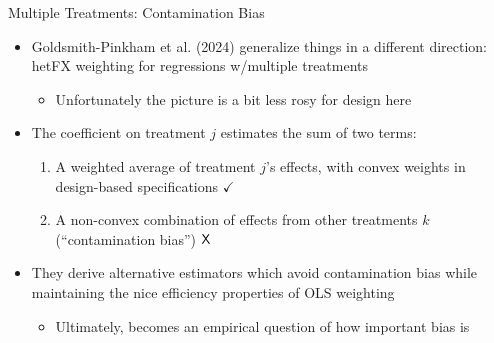 \documentclass[11pt,english]{beamer}
\begin{document}
\begin{frame}{Multiple Treatments: Contamination Bias}
\begin{itemize}
\item Goldsmith-Pinkham et al. (2024) generalize things in a different direction: hetFX weighting for regressions w/multiple treatments\smallskip
\begin{itemize}
\item Unfortunately the picture is a bit less rosy for design here
\end{itemize}\bigskip\pause{}
\item The coefficient on treatment $j$ estimates the sum of two terms:\smallskip
\begin{enumerate}
\item A weighted average of treatment $j$'s effects, with convex weights in design-based specifications $\checkmark$\smallskip\pause{}
\item A non-convex combination of effects from other treatments $k$ (``contamination bias'') $\text{\sffamily X}$
\end{enumerate}\bigskip\pause{}
\item They derive alternative estimators which avoid contamination bias while maintaining the nice efficiency properties of OLS weighting\smallskip
\begin{itemize}
\item Ultimately, becomes an empirical question of how important bias is
\end{itemize}
\end{itemize}
\end{frame}
\end{document}
